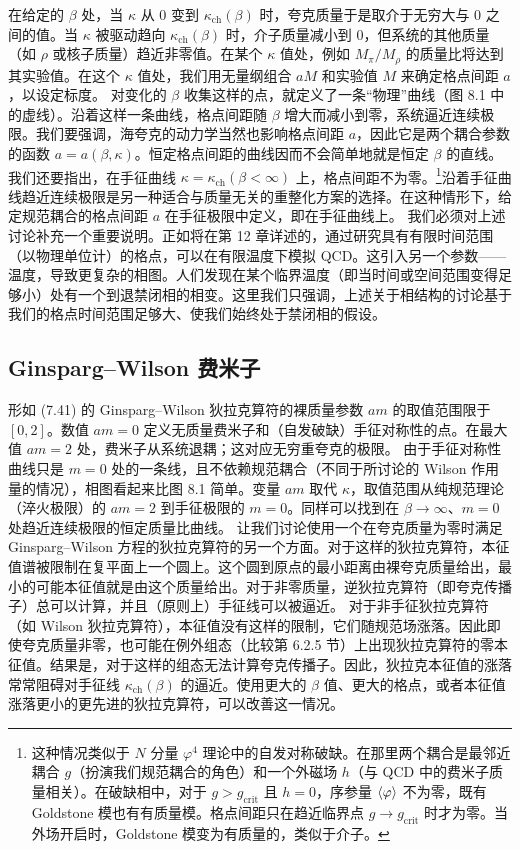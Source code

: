 在给定的 $\beta$ 处，当 $\kappa$ 从 0 变到 $\kappa_{\mathrm{ch}}(\beta)$ 时，夸克质量于是取介于无穷大与 0 之间的值。当 $\kappa$ 被驱动趋向 $\kappa_{\mathrm{ch}}(\beta)$ 时，介子质量减小到 0，但系统的其他质量（如 $\rho$ 或核子质量）趋近非零值。在某个 $\kappa$ 值处，例如 $M_\pi/M_\rho$ 的质量比将达到其实验值。在这个 $\kappa$ 值处，我们用无量纲组合 $aM$ 和实验值 $M$ 来确定格点间距 $a$，以设定标度。
对变化的 $\beta$ 收集这样的点，就定义了一条``物理''曲线（图 8.1 中的虚线）。沿着这样一条曲线，格点间距随 $\beta$ 增大而减小到零，系统逼近连续极限。我们要强调，海夸克的动力学当然也影响格点间距 $a$，因此它是两个耦合参数的函数 $a = a(\beta, \kappa)$。恒定格点间距的曲线因而不会简单地就是恒定 $\beta$ 的直线。我们还要指出，在手征曲线 $\kappa = \kappa_{\mathrm{ch}}(\beta < \infty)$ 上，格点间距不为零。\footnote{这种情况类似于 $N$ 分量 $\varphi^4$ 理论中的自发对称破缺。在那里两个耦合是最邻近耦合 $g$（扮演我们规范耦合的角色）和一个外磁场 $h$（与 QCD 中的费米子质量相关）。在破缺相中，对于 $g > g_{\mathrm{crit}}$ 且 $h = 0$，序参量 $\left\langle \varphi \right\rangle$ 不为零，既有 Goldstone 模也有有质量模。格点间距只在趋近临界点 $g \to g_{\mathrm{crit}}$ 时才为零。当外场开启时，Goldstone 模变为有质量的，类似于介子。}沿着手征曲线趋近连续极限是另一种适合与质量无关的重整化方案的选择。在这种情形下，给定规范耦合的格点间距 $a$ 在手征极限中定义，即在手征曲线上。
我们必须对上述讨论补充一个重要说明。正如将在第 12 章详述的，通过研究具有有限时间范围（以物理单位计）的格点，可以在有限温度下模拟 QCD。这引入另一个参数——温度，导致更复杂的相图。人们发现在某个临界温度（即当时间或空间范围变得足够小）处有一个到退禁闭相的相变。这里我们只强调，上述关于相结构的讨论基于我们的格点时间范围足够大、使我们始终处于禁闭相的假设。

\subsection{Ginsparg--Wilson 费米子}

形如 (7.41) 的 Ginsparg--Wilson 狄拉克算符的裸质量参数 $am$ 的取值范围限于 $[0, 2]$。数值 $am = 0$ 定义无质量费米子和（自发破缺）手征对称性的点。在最大值 $am = 2$ 处，费米子从系统退耦；这对应无穷重夸克的极限。
由于手征对称性曲线只是 $m = 0$ 处的一条线，且不依赖规范耦合（不同于所讨论的 Wilson 作用量的情况），相图看起来比图 8.1 简单。变量 $am$ 取代 $\kappa$，取值范围从纯规范理论（淬火极限）的 $am = 2$ 到手征极限的 $m = 0$。同样可以找到在 $\beta \to \infty$、$m = 0$ 处趋近连续极限的恒定质量比曲线。
让我们讨论使用一个在夸克质量为零时满足 Ginsparg--Wilson 方程的狄拉克算符的另一个方面。对于这样的狄拉克算符，本征值谱被限制在复平面上一个圆上。这个圆到原点的最小距离由裸夸克质量给出，最小的可能本征值就是由这个质量给出。对于非零质量，逆狄拉克算符（即夸克传播子）总可以计算，并且（原则上）手征线可以被逼近。
对于非手征狄拉克算符（如 Wilson 狄拉克算符），本征值没有这样的限制，它们随规范场涨落。因此即使夸克质量非零，也可能在例外组态（比较第 6.2.5 节）上出现狄拉克算符的零本征值。结果是，对于这样的组态无法计算夸克传播子。因此，狄拉克本征值的涨落常常阻碍对手征线 $\kappa_{\mathrm{ch}}(\beta)$ 的逼近。使用更大的 $\beta$ 值、更大的格点，或者本征值涨落更小的更先进的狄拉克算符，可以改善这一情况。

